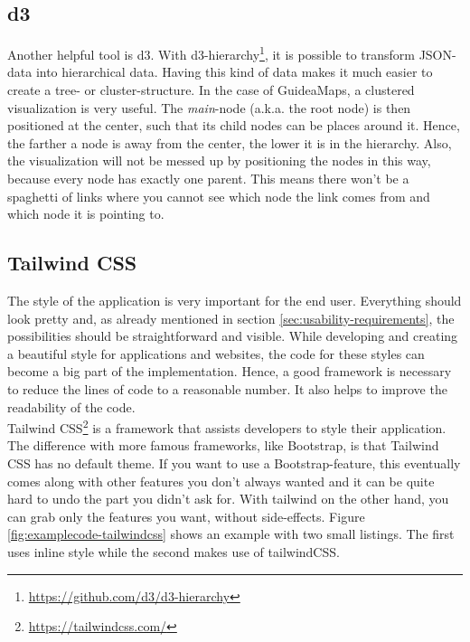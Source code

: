 \subsection{d3}\label{sec:d3}
Another helpful tool is d3. With d3-hierarchy\footnote{\url{https://github.com/d3/d3-hierarchy}}, it is possible to transform JSON-data into hierarchical data. Having this kind of data makes it much easier to create a tree- or cluster-structure. In the case of GuideaMaps, a clustered visualization is very useful. The \textit{main}-node (a.k.a. the root node) is then positioned at the center, such that its child nodes can be places around it. Hence, the farther a node is away from the center, the lower it is in the hierarchy. Also, the visualization will not be messed up by positioning the nodes in this way, because every node has exactly one parent. This means there won't be a spaghetti of links where you cannot see which node the link comes from and which node it is pointing to.

\subsection{Tailwind CSS}\label{sec:tailwind}
The style of the application is very important for the end user. Everything should look pretty and, as already mentioned in section \ref{sec:usability-requirements}, the possibilities should be straightforward and visible. While developing and creating a beautiful style for applications and websites, the code for these styles can become a big part of the implementation. Hence, a good framework is necessary to reduce the lines of code to a reasonable number. It also helps to improve the readability of the code.\\

Tailwind CSS\footnote{\url{https://tailwindcss.com/}} is a framework that assists developers to style their application. The difference with more famous frameworks, like Bootstrap, is that Tailwind CSS has no default theme. If you want to use a Bootstrap-feature, this eventually comes along with other features you don't always wanted and it can be quite hard to undo the part you didn't ask for. With tailwind on the other hand, you can grab only the features you want, without side-effects. Figure \ref{fig:examplecode-tailwindcss} shows an example with two small listings. The first uses inline style while the second makes use of tailwindCSS.\\

